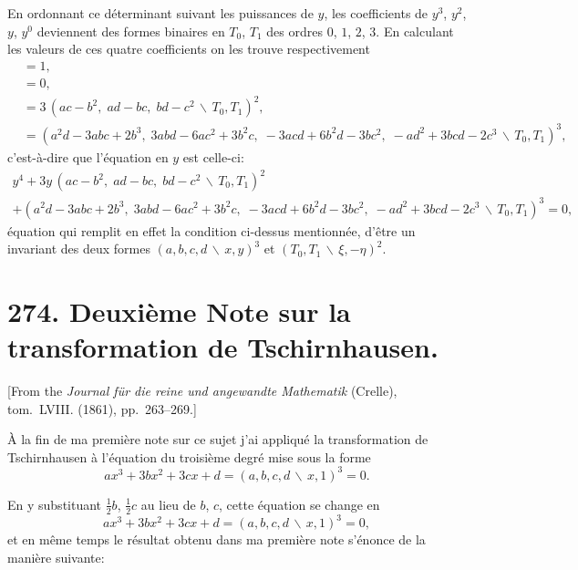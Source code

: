 \documentclass[11pt,a4paper]{article}
\theoremstyle{definition}
\begin{document}
En ordonnant ce d\'{e}terminant suivant les puissances de $y$, les coefficients de
$y^{3}$, $y^{2}$, $y$, $y^{0}$ deviennent des formes binaires en $T_{0}$, $T_{1}$ des ordres
$0$, $1$, $2$, $3$. En calculant les valeurs de ces quatre coefficients on les trouve
respectivement
\begin{align*}
&= 1,\\
&= 0,\\
&= 3\,(ac-b^{2},\; ad-bc,\; bd-c^{2}\,\backslash\!\!\,T_{0},T_{1})^{2},\\
&= (a^{2}d-3abc+2b^{3},\; 3abd-6ac^{2}+3b^{2}c,\; -3acd+6b^{2}d-3bc^{2},\; -ad^{2}+3bcd-2c^{3}\,\backslash\!\!\,T_{0},T_{1})^{3},
\end{align*}
c'est-\`{a}-dire que l'\'{e}quation en $y$ est celle-ci:
\begin{multline*}
y^{4} + 3y\,(ac-b^{2},\; ad-bc,\; bd-c^{2}\,\backslash\!\!\,T_{0},T_{1})^{2} \\
+ (a^{2}d-3abc+2b^{3},\; 3abd-6ac^{2}+3b^{2}c,\; -3acd+6b^{2}d-3bc^{2},\; -ad^{2}+3bcd-2c^{3}\,\backslash\!\!\,T_{0},T_{1})^{3} = 0,
\end{multline*}
\'{e}quation qui remplit en effet la condition ci-dessus mentionn\'{e}e, d'\^{e}tre un invariant
des deux formes $(a,b,c,d\,\backslash\!\!\,x,y)^{3}$ et $(T_{0},T_{1}\,\backslash\!\!\,\xi,-\eta)^{2}$.

\newpage
\section*{274. Deuxi\`{e}me Note sur la transformation de Tschirnhausen.}

[From the \textit{Journal f\"{u}r die reine und angewandte Mathematik} (Crelle),
tom.~LVIII. (1861), pp.~263--269.]
\vspace{0.5em}

\`{A} la fin de ma premi\`{e}re note sur ce sujet j'ai appliqu\'{e} la transformation de
Tschirnhausen \`{a} l'\'{e}quation du troisi\`{e}me degr\'{e} mise sous la forme
\[ax^{3}+3bx^{2}+3cx+d = (a,b,c,d\,\backslash\!\!\,x,1)^{3} = 0.\]

En y substituant $\tfrac{1}{2}b$, $\tfrac{1}{2}c$ au lieu de $b$, $c$, cette \'{e}quation se change en
\[ax^{3}+3bx^{2}+3cx+d = (a,b,c,d\,\backslash\!\!\,x,1)^{3} = 0,\]
et en m\^{e}me temps le r\'{e}sultat obtenu dans ma premi\`{e}re note s'\'{e}nonce de la
mani\`{e}re suivante:
\end{document}
